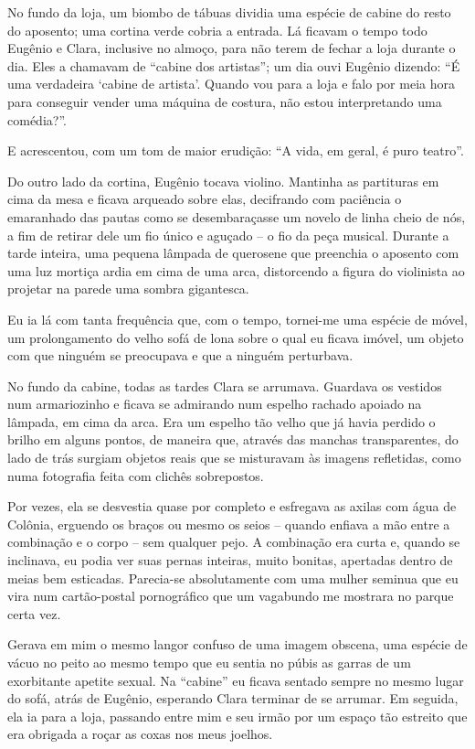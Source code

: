 No fundo da loja, um biombo de tábuas dividia uma espécie de cabine do resto do aposento; uma cortina verde cobria a entrada. Lá ficavam o tempo todo Eugênio e Clara, inclusive no almoço, para não terem de fechar a loja durante o dia. Eles a chamavam de ``cabine dos artistas''; um dia ouvi Eugênio dizendo: ``É uma verdadeira ‘cabine de artista’. Quando vou para a loja e falo por meia hora para conseguir vender uma máquina de costura, não estou interpretando uma comédia?''.

E acrescentou, com um tom de maior erudição: ``A vida, em geral, é puro teatro''.

Do outro lado da cortina, Eugênio tocava violino. Mantinha as partituras em cima da mesa e ficava arqueado sobre elas, decifrando com paciência o emaranhado das pautas como se desembaraçasse um novelo de linha cheio de nós, a fim de retirar dele um fio único e aguçado -- o fio da peça musical. Durante a tarde inteira, uma pequena lâmpada de querosene que preenchia o aposento com uma luz mortiça ardia em cima de uma arca, distorcendo a figura do violinista ao projetar na parede uma sombra gigantesca.

Eu ia lá com tanta frequência que, com o tempo, tornei-me uma espécie de móvel, um prolongamento do velho sofá de lona sobre o qual eu ficava imóvel, um objeto com que ninguém se preocupava e que a ninguém perturbava.

No fundo da cabine, todas as tardes Clara se arrumava. Guardava os vestidos num armariozinho e ficava se admirando num espelho rachado apoiado na lâmpada, em cima da arca. Era um espelho tão velho que já havia perdido o brilho em alguns pontos, de maneira que, através das manchas transparentes, do lado de trás surgiam objetos reais que se misturavam às imagens refletidas, como numa fotografia feita com clichês sobrepostos.

Por vezes, ela se desvestia quase por completo e esfregava as axilas com água de Colônia, erguendo os braços ou mesmo os seios -- quando enfiava a mão entre a combinação e o corpo -- sem qualquer pejo. A combinação era curta e, quando se inclinava, eu podia ver suas pernas inteiras, muito bonitas, apertadas dentro de meias bem esticadas. Parecia-se absolutamente com uma mulher seminua que eu vira num cartão-postal pornográfico que um vagabundo me mostrara no parque certa vez.

Gerava em mim o mesmo langor confuso de uma imagem obscena, uma espécie de vácuo no peito ao mesmo tempo que eu sentia no púbis as garras de um exorbitante apetite sexual.
Na ``cabine'' eu ficava sentado sempre no mesmo lugar do sofá, atrás de Eugênio, esperando Clara terminar de se arrumar. Em seguida, ela ia para a loja, passando entre mim e seu irmão por um espaço tão estreito que era obrigada a roçar as coxas nos meus joelhos.

